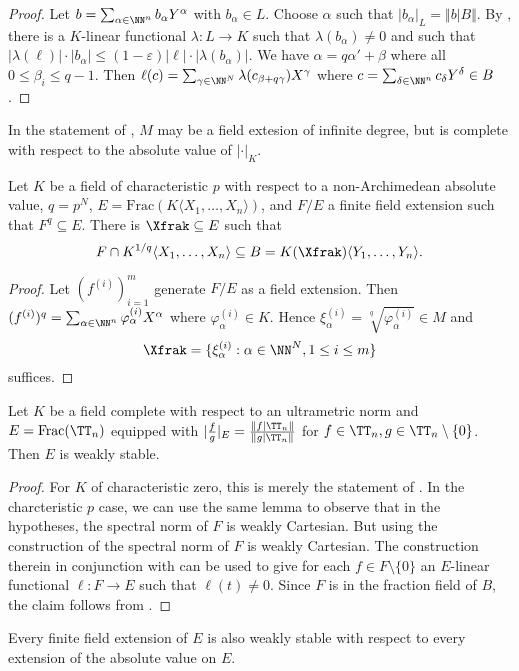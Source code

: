 \begin{proof}
    Let $b=\sum_{\alpha\in\NN^{n}}b_{\alpha}Y^{\alpha}$ with $b_{\alpha}\in L$. Choose $\alpha$ such that $|b_{\alpha}|_{L}=\Vert b|B\Vert$. By , there is a $K$-linear functional $\lambda:L\to K$ such that $\lambda(b_{\alpha})\neq0$ and such that $|\lambda(\ell)|\cdot|b_{\alpha}|\leq(1-\varepsilon)|\ell|\cdot|\lambda(b_{\alpha})|$. We have $\alpha=q\alpha'+\beta$ where all $0\leq \beta_{i}\leq q-1$. Then $\ell(c)=\sum_{\gamma\in\NN^{N}}\lambda(c_{\beta+q\gamma})X^{\gamma}$ where $c=\sum_{\delta\in\NN^{n}}c_{\delta}Y^{\delta}\in B$. 
\end{proof}
\begin{remark}
    In the statement of , $M$ may be a field extesion of infinite degree, but is complete with respect to the absolute value of $|\cdot|_{K}$. 
\end{remark}
\begin{lemma}\label{lem: existence of finite generators of extension}
    Let $K$ be a field of characteristic $p$ with respect to a non-Archimedean absolute value, $q=p^{N}$, $E=\mathrm{Frac}(K\langle X_{1},\dots,X_{n}\rangle)$, and $F/E$ a finite field extension such that $F^{q}\subseteq E$. There is $\Xfrak\subseteq E$ such that 
    $$F\cap K^{1/q}\langle X_{1},\dots,X_{n}\rangle\subseteq B=K(\Xfrak)\langle Y_{1},\dots,Y_{n}\rangle.$$
\end{lemma}
\begin{proof}
    Let $(f^{(i)})_{i=1}^{m}$ generate $F/E$ as a field extension. Then $(f^{(i)})^{q}=\sum_{\alpha\in\NN^{n}}\varphi_{\alpha}^{(i)}X^{\alpha}$ where $\varphi_{\alpha}^{(i)}\in K$. Hence $\xi_{\alpha}^{(i)}=\sqrt[q]{\varphi_{\alpha}^{(i)}}\in M$ and 
    $$\Xfrak=\{\xi_{\alpha}^{(i)}:\alpha\in\NN^{N},1\leq i\leq m\}$$
    suffices. 
\end{proof}
\begin{proposition}\label{prop: fractions of Tate algebra is weakly stable}
    Let $K$ be a field complete with respect to an ultrametric norm and $E=\mathrm{Frac}(\TT_{n})$ equipped with $|\frac{f}{g}|_{E}=\frac{\Vert f|\TT_{n}\Vert}{\Vert g|\TT_{n}\Vert}$ for $f\in\TT_{n},g\in\TT_{n}\setminus\{0\}$. Then $E$ is weakly stable. 
\end{proposition}
\begin{proof}
    For $K$ of characteristic zero, this is merely the statement of . In the charcteristic $p$ case, we can use the same lemma to observe that in the hypotheses, the spectral norm of $F$ is weakly Cartesian. But using the construction of  the spectral norm of $F$ is weakly Cartesian. The construction therein in conjunction with  can be used to give for each $f\in F\setminus\{0\}$ an $E$-linear functional $\ell:F\to E$ such that $\ell(t)\neq0$. Since $F$ is in the fraction field of $B$, the claim follows from . 
\end{proof}
\begin{remark}
    Every finite field extension of $E$ is also weakly stable with respect to every extension of the absolute value on $E$. 
\end{remark}
